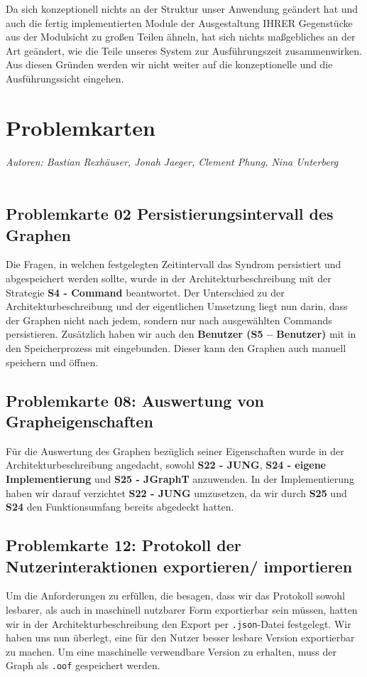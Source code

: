 \documentclass[enabledeprecatedfontcommands,fontsize=11pt,paper=a4,twoside]{scrartcl}
\newcounter{one}
\newcounter{two}[one]
\begin{document}
Da sich konzeptionell nichts an der Struktur unser Anwendung geändert hat und auch die fertig implementierten Module der Ausgestaltung IHRER Gegenstücke aus der Modulsicht zu großen Teilen ähneln, hat sich nichts maßgebliches an der Art geändert, wie die Teile unseres System zur Ausführungszeit zusammenwirken. Aus diesen Gründen werden wir nicht weiter auf die konzeptionelle und die Ausführungssicht eingehen. \\
\newpage

\section{Problemkarten}
\emph{Autoren: Bastian Rexhäuser, Jonah Jaeger, Clement Phung, Nina Unterberg}\\ \\

\subsection{Problemkarte 02 Persistierungsintervall des Graphen}
Die Fragen, in welchen festgelegten Zeitintervall das Syndrom persistiert und abgespeichert werden sollte, wurde in der Architekturbeschreibung mit der Strategie \textbf{S4 - Command} beantwortet. Der Unterschied zu der Architekturbeschreibung und der eigentlichen Umsetzung liegt nun darin, dass der Graphen nicht nach jedem, sondern nur nach ausgewählten Commands persistieren. Zusätzlich haben wir auch den \textbf{Benutzer (S5 – Benutzer)} mit in den Speicherprozess mit eingebunden. Dieser kann den Graphen auch manuell speichern und öffnen. \\

\subsection{Problemkarte 08: Auswertung von Grapheigenschaften}
Für die Auswertung des Graphen bezüglich seiner Eigenschaften wurde in der Architekturbeschreibung angedacht, sowohl \textbf{S22 - JUNG}, \textbf{S24 - eigene Implementierung} und \textbf{S25 - JGraphT} anzuwenden. In der Implementierung haben wir darauf verzichtet \textbf{S22 - JUNG} umzusetzen, da wir durch \textbf{S25} und \textbf{S24} den Funktionsumfang bereits abgedeckt hatten. \\

\subsection{Problemkarte 12: Protokoll der Nutzerinteraktionen exportieren/ importieren}
Um die Anforderungen zu erfüllen, die besagen, dass wir das Protokoll sowohl lesbarer, als auch in maschinell nutzbarer Form exportierbar sein müssen, hatten wir in der Architekturbeschreibung den Export per \texttt{.json}-Datei festgelegt. Wir haben uns nun überlegt, eine für den Nutzer besser lesbare Version exportierbar zu machen. Um eine maschinelle verwendbare Version zu erhalten, muss der Graph als \texttt{.oof} gespeichert werden.\\
\end{document}
